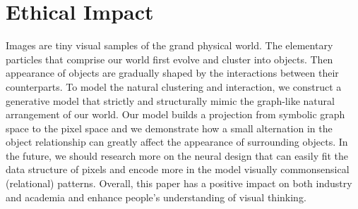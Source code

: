 \section*{Ethical Impact}
Images are tiny visual samples of the grand physical world. The elementary particles that comprise our world first evolve and cluster into objects. Then appearance of objects are gradually shaped by the interactions between their counterparts. To model the natural clustering and interaction, we construct a generative model that strictly and structurally mimic the graph-like natural arrangement of our world. Our model builds a projection from symbolic graph space to the pixel space and we demonstrate how a small alternation in the object relationship can greatly affect the appearance of surrounding objects. In the future, we should research more on the neural design that can easily fit the data structure of pixels and encode more in the model visually commonsensical (relational) patterns. Overall, this paper has a positive impact on both industry and academia and enhance people's understanding of visual thinking. 
